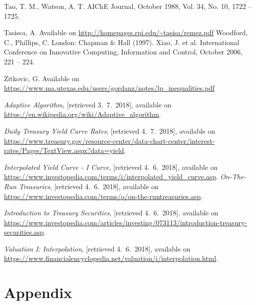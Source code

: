 \documentclass[a4paper,10pt]{article}
\begin{document}
\begin{thebibliography}{99}
%
Tao, T. M., Watson, A. T.
\newblock AIChE Journal, October 1988, Vol. 34, No. 10, 1722 \--- 1725.

%
Tasissa, A.
\newblock Available on \url{http://homepages.rpi.edu/~tasisa/remez.pdf}
%
Woodford, C., Phillips, C.
\newblock London: Chapman \& Hall (1997).
%
Xiao, J. et al.
\newblock International Conference on Innovative Computing, Information and Control, October 2006, 221 \--- 224.

%
Zitkovic, G.
\newblock Available on \url{https://www.ma.utexas.edu/users/gordanz/notes/lp_inequalities.pdf}

%
{\emph{Adaptive Algorithm}, [retrieved 3.~7.~2018], available on \url{https://en.wikipedia.org/wiki/Adaptive_algorithm}.}

%
{\emph{Daily Treasury Yield Curve Rates}, [retrieved 4.~7.~2018], available on \url{https://www.treasury.gov/resource-center/data-chart-center/interest-rates/Pages/TextView.aspx?data=yield}.}

%
{\emph{Interpolated Yield Curve - I Curve}, [retrieved 4.~6.~2018], available on \url{https://www.investopedia.com/terms/i/interpolated_yield_curve.asp}.}
%
{\emph{On-The-Run Treasuries}, [retrieved 4.~6.~2018], available on \url{https://www.investopedia.com/terms/o/on-the-runtreasuries.asp}.}

%
{\emph{Introduction to Treasury Securities}, [retrieved 4.~6.~2018], available on \url{https://www.investopedia.com/articles/investing/073113/introduction-treasury-securities.asp}.}

%
{\emph{Valuation I: Interpolation}, [retrieved 4.~6.~2018], available on \url{https://www.financialencyclopedia.net/valuation/i/interpolation.html}.}

\end{thebibliography}
\newpage
\section*{Appendix}
\end{document}
